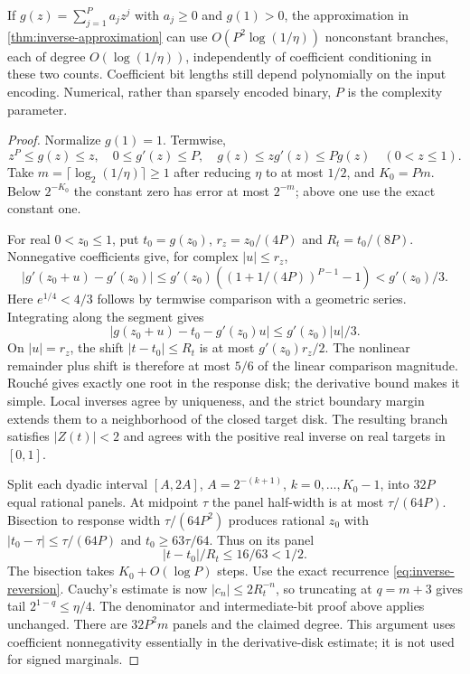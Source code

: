 \begin{proposition}
\label{prop:positive-inverse}
If $g(z)=\sum_{j=1}^P a_jz^j$ with $a_j\ge0$ and $g(1)>0$,
the approximation in \cref{thm:inverse-approximation} can use
$O(P^2\log(1/\eta))$ nonconstant branches, each of degree
$O(\log(1/\eta))$, independently of coefficient conditioning in these
two counts. Coefficient bit lengths still depend polynomially on the
input encoding. Numerical, rather than sparsely encoded binary, $P$
is the complexity parameter.
\end{proposition}
\begin{proof}
Normalize $g(1)=1$. Termwise,
\[
 z^P\le g(z)\le z,\quad 0\le g'(z)\le P,\quad
                g(z)\le zg'(z)\le Pg(z)\quad(0<z\le1).
\]
Take $m=\lceil\log_2(1/\eta)\rceil\ge1$ after reducing
$\eta$ to at most $1/2$, and $K_0=Pm$. Below $2^{-K_0}$ the
constant zero has error at most $2^{-m}$; above one use the exact
constant one.

For real $0<z_0\le1$, put $t_0=g(z_0)$,
$r_z=z_0/(4P)$ and $R_t=t_0/(8P)$. Nonnegative coefficients give,
for complex $|u|\le r_z$,
\[
 |g'(z_0+u)-g'(z_0)|
 \le g'(z_0)((1+1/(4P))^{P-1}-1)<g'(z_0)/3.
\]
Here $e^{1/4}<4/3$ follows by termwise comparison with a geometric
series. Integrating along the segment gives
\[
 |g(z_0+u)-t_0-g'(z_0)u|\le g'(z_0)|u|/3.
\]
On $|u|=r_z$, the shift $|t-t_0|\le R_t$ is at most
$g'(z_0)r_z/2$. The nonlinear remainder plus shift is therefore
at most $5/6$ of the linear comparison magnitude. Rouch\'e gives
exactly one root in the response disk; the derivative bound makes it
simple. Local inverses agree by uniqueness, and the strict boundary
margin extends them to a neighborhood of the closed target disk.
The resulting branch satisfies $|Z(t)|<2$ and agrees with the
positive real inverse on real targets in $[0,1]$.

Split each dyadic interval $[A,2A]$, $A=2^{-(k+1)}$,
$k=0,\ldots,K_0-1$, into $32P$ equal rational panels. At midpoint
$\tau$ the panel half-width is at most $\tau/(64P)$.
Bisection to response width $\tau/(64P^2)$ produces rational
$z_0$ with $|t_0-\tau|\le\tau/(64P)$ and
$t_0\ge63\tau/64$. Thus on its panel
\[
             |t-t_0|/R_t\le16/63<1/2.
\]
The bisection takes $K_0+O(\log P)$ steps. Use the exact recurrence
\eqref{eq:inverse-reversion}. Cauchy's estimate is now
$|c_n|\le2R_t^{-n}$, so truncating at $q=m+3$ gives tail
$2^{1-q}\le\eta/4$. The denominator and intermediate-bit proof
above applies unchanged. There are $32P^2m$ panels and the claimed
degree. This argument uses coefficient nonnegativity essentially in
the derivative-disk estimate; it is not used for signed marginals.
\end{proof}
